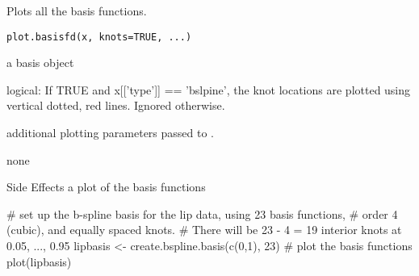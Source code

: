 \begin{Description}\relax
Plots all the basis functions.
\end{Description}
\begin{Usage}
\begin{verbatim}
plot.basisfd(x, knots=TRUE, ...)
\end{verbatim}
\end{Usage}
\begin{Arguments}
\begin{ldescription}
\item[\code{x}] a basis object

\item[\code{knots}] logical:  If TRUE and x[['type']] == 'bslpine', the knot locations
are plotted using vertical dotted, red lines.  Ignored otherwise.  

\item[\code{... }] additional plotting parameters passed to .  

\end{ldescription}
\end{Arguments}
\begin{Value}
none
\end{Value}
\begin{Section}{Side Effects}
a plot of the basis functions
\end{Section}
\begin{SeeAlso}\relax
{}
\end{SeeAlso}
\begin{Examples}
\begin{ExampleCode}

# set up the b-spline basis for the lip data, using 23 basis functions,
#   order 4 (cubic), and equally spaced knots.
#  There will be 23 - 4 = 19 interior knots at 0.05, ..., 0.95
lipbasis <- create.bspline.basis(c(0,1), 23)
# plot the basis functions
plot(lipbasis)

\end{ExampleCode}
\end{Examples}

